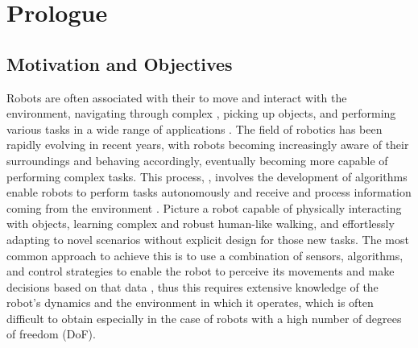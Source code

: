 \chapter*{Prologue}
\label{chp:00-Prologue}

\section*{Motivation and Objectives}

Robots are often associated with their   to move and interact with the environment, navigating through complex , picking up objects, and performing various tasks in a wide range of applications \citep{article,zeng_robotic_2022} . The field of robotics has been rapidly evolving in recent years, with robots becoming increasingly aware of their surroundings and behaving accordingly, eventually becoming more capable of performing complex tasks. This process, , involves the development of algorithms   enable robots to perform tasks autonomously and receive and process information coming from the environment  . Picture a robot capable of physically interacting with objects, learning complex and robust human-like walking, and effortlessly adapting to novel scenarios without explicit design for those new tasks.
The most common approach to achieve this is to use a combination of sensors, algorithms, and control strategies to enable the robot to perceive its movements and make decisions based on that data \citep{lara_embodied_2018, vaisi_review_2022}, thus this requires extensive knowledge of the robot's dynamics and the environment in which it operates, which is often difficult to obtain especially in the case of robots with a high number of degrees of freedom (\ac{DoF}).


